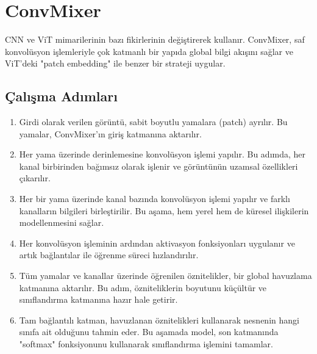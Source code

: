\section{ConvMixer}

CNN ve ViT mimarilerinin bazı fikirlerinin değiştirerek kullanır. ConvMixer, saf konvolüsyon işlemleriyle çok katmanlı bir yapıda global bilgi akışını sağlar ve ViT'deki "patch embedding" ile benzer bir strateji uygular.

\subsection{Çalışma Adımları}

\begin{enumerate}
    \item Girdi olarak verilen görüntü, sabit boyutlu yamalara (patch) ayrılır. Bu yamalar, ConvMixer'ın giriş katmanına aktarılır.
    \item Her yama üzerinde derinlemesine konvolüsyon işlemi yapılır. Bu adımda, her kanal birbirinden bağımsız olarak işlenir ve görüntünün uzamsal özellikleri çıkarılır.
    \item Her bir yama üzerinde kanal bazında konvolüsyon işlemi yapılır ve farklı kanalların bilgileri birleştirilir. Bu aşama, hem yerel hem de küresel ilişkilerin modellenmesini sağlar.
    \item Her konvolüsyon işleminin ardından aktivasyon fonksiyonları uygulanır ve artık bağlantılar ile öğrenme süreci hızlandırılır.
    \item Tüm yamalar ve kanallar üzerinde öğrenilen öznitelikler, bir global havuzlama katmanına aktarılır. Bu adım, özniteliklerin boyutunu küçültür ve sınıflandırma katmanına hazır hale getirir.
    \item Tam bağlantılı katman, havuzlanan öznitelikleri kullanarak nesnenin hangi sınıfa ait olduğunu tahmin eder. Bu aşamada model, son katmanında "softmax" fonksiyonunu kullanarak sınıflandırma işlemini tamamlar.
\end{enumerate}

\newpage